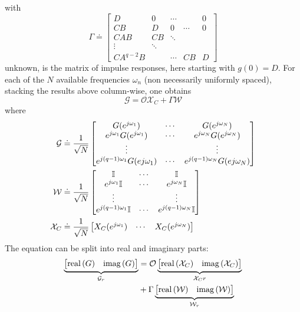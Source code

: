 with
\begin{equation*}
  \Gamma \doteq
  \begin{bmatrix}
    D & 0 & \cdots & & 0 \\
    CB & D & 0 & \cdots & 0 \\
    CAB & CB & \ddots \\
    \vdots & \ddots \\
    CA^{q-2}B & & \cdots & CB & D
  \end{bmatrix}
\end{equation*}
unknown, is the matrix of impulse responses, here starting with $g(0)=D$. For each of the $N$ available frequencies $\omega_n$ (non necessarily uniformly spaced), stacking the results above column-wise, one obtains
\begin{equation}
  \label{eq:subpace-indentification-nonuniformly}
  \mathcal{G} = \mathcal{O}\mathcal{X}_C + \Gamma \mathcal{W}
\end{equation}
where
\begin{align*}
  \mathcal{G} &\doteq \frac{1}{\sqrt{N}}
  \begin{bmatrix}
    G(e^{j\omega_1}) & \cdots & G(e^{j\omega_N}) \\
    e^{j\omega_1}G(e^{j\omega_1}) & \cdots & e^{j\omega_N}G(e^{j\omega_N}) \\
    \vdots & & \vdots \\
    e^{j(q-1)\omega_1}G(e{j\omega_1}) & \cdots & e^{j(q-1)\omega_N}G(e{j\omega_N})
  \end{bmatrix} \\
  \mathcal{W} &\doteq \frac{1}{\sqrt{N}}
                \begin{bmatrix}
                  \mathbb{I} & \cdots & \mathbb{I} \\
                  e^{j\omega_1} \mathbb{I} & \cdots & e^{j\omega_N} \mathbb{I} \\
                  \vdots & & \vdots \\
                  e^{j(q-1)\omega_1} \mathbb{I} & \cdots & e^{j(q-1)\omega_N} \mathbb{I}
                \end{bmatrix} \\
  \mathcal{X}_C &\doteq \frac{1}{\sqrt{N}}
                  \begin{bmatrix}
                    X_C(e^{j\omega_1}) & \cdots & X_C(e^{j\omega_N})
                  \end{bmatrix}
\end{align*}
The equation can be split into real and imaginary parts:
\begin{align*}
  \underbrace{\begin{bmatrix}
    \textrm{real}\left(G\right) & \textrm{imag}\left(G\right)
  \end{bmatrix}}_{\mathcal{G}_r} &= \mathcal{O}
  \underbrace{\begin{bmatrix}
    \textrm{real}\left(\mathcal{X}_C\right) & \textrm{imag}\left(\mathcal{X}_C\right)
  \end{bmatrix}}_{\mathcal{X}_Cr} \\
             &+ \Gamma
  \underbrace{\begin{bmatrix}
    \textrm{real}\left(\mathcal{W}\right) & \textrm{imag}\left(\mathcal{W}\right)
  \end{bmatrix}}_{\mathcal{W}_r}
\end{align*}
